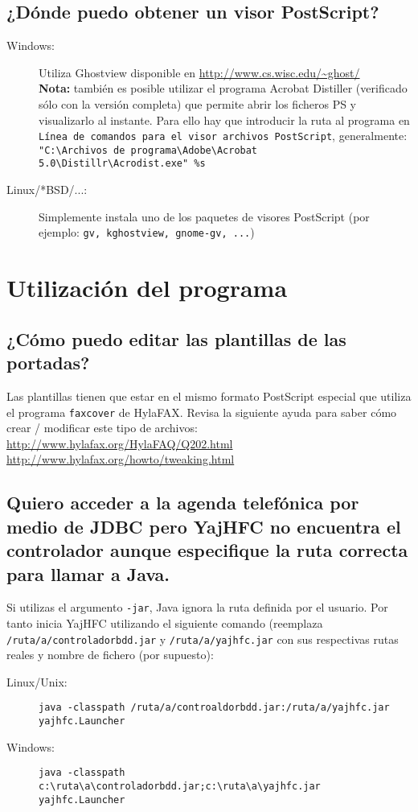 \documentclass[a4paper,10pt]{scrartcl}
\begin{document}
\subsection{¿Dónde puedo obtener un visor PostScript?}
\begin{description}
\item[Windows:] Utiliza Ghostview disponible en
\url{http://www.cs.wisc.edu/~ghost/}\\
\textbf{Nota:} también es posible utilizar el programa Acrobat Distiller
(verificado sólo con la versión completa) que permite abrir los ficheros PS
y visualizarlo al instante. Para ello hay que introducir la ruta al programa
en \texttt{Línea de comandos para el visor archivos PostScript},
generalmente:
\verb#"C:\Archivos de programa\Adobe\Acrobat 5.0\Distillr\Acrodist.exe" %s#

\item[Linux/*BSD/...:] Simplemente instala uno de los paquetes de visores
PostScript
(por ejemplo: \texttt{gv, kghostview, gnome-gv, ...})
\end{description}


\section{Utilización del programa}	

\subsection{¿Cómo puedo editar las plantillas de las portadas?}
Las plantillas tienen que estar en el mismo formato PostScript especial 
que utiliza el programa \texttt{faxcover} de HylaFAX. Revisa la siguiente ayuda 
para saber cómo crear / modificar este tipo de archivos: \\
\url{http://www.hylafax.org/HylaFAQ/Q202.html}\\
\url{http://www.hylafax.org/howto/tweaking.html}\\

\subsection{Quiero acceder a la agenda telefónica por medio de JDBC pero YajHFC no encuentra el controlador aunque especifique la ruta correcta para llamar a Java.}

Si utilizas el argumento \texttt{-jar}, Java ignora la ruta definida por el usuario.
Por tanto inicia YajHFC utilizando el siguiente comando (reemplaza \texttt{/ruta/a/controladorbdd.jar} y \texttt{/ruta/a/yajhfc.jar} con sus respectivas rutas reales y nombre de fichero (por supuesto):
\begin{description}
\item [Linux/Unix:] \verb#java -classpath /ruta/a/controaldorbdd.jar:/ruta/a/yajhfc.jar yajhfc.Launcher#
\item [Windows:] \verb#java -classpath c:\ruta\a\controladorbdd.jar;c:\ruta\a\yajhfc.jar yajhfc.Launcher#
\end{description}
\end{document}
